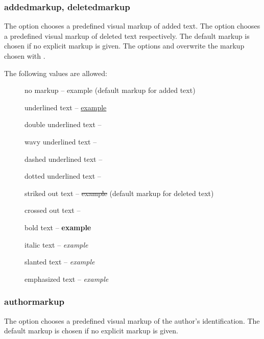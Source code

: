 

\subsubsection{addedmarkup, deletedmarkup}

The  option chooses a predefined visual markup of added text.
The  option chooses a predefined visual markup of deleted text respectively.
The default markup is chosen if no explicit markup is given.
The options  and  overwrite the markup chosen with .

The following values are allowed:
\begin{description}
	\item [] no markup -- example (default markup for added text)
	\item [] underlined text -- \uline{example}
	\item [] double underlined text -- 
	\item [] wavy underlined text -- 
	\item [] dashed underlined text -- 
	\item [] dotted underlined text -- 
	\item [] striked out text -- \sout{example} (default markup for deleted text)
	\item [] crossed out text -- 
	\item [] bold text -- \textbf{example}
	\item [] italic text -- \textit{example}
	\item [] slanted text -- \textsl{example}
	\item [] emphasized text -- \emph{example}
\end{description}





\subsubsection{authormarkup}

The  option chooses a predefined visual markup of the author's identification.
The default markup is chosen if no explicit markup is given.

